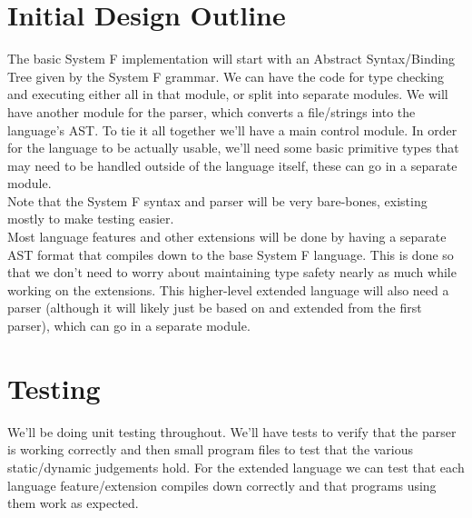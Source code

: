 \documentclass[a4paper,12pt]{article}
\begin{document}
\section{Initial Design Outline}

The basic System F implementation will start with an Abstract Syntax/Binding Tree given by the System F grammar. We can have the code for type checking and executing either all in that module, or split into separate modules. We will have another module for the parser, which converts a file/strings into the language's AST. To tie it all together we'll have a main control module. In order for the language to be actually usable, we'll need some basic primitive types that may need to be handled outside of the language itself, these can go in a separate module.\\

Note that the System F syntax and parser will be very bare-bones, existing mostly to make testing easier.\\

Most language features and other extensions will be done by having a separate AST format that compiles down to the base System F language. This is done so that we don't need to worry about maintaining type safety nearly as much while working on the extensions. This higher-level extended language will also need a parser (although it will likely just be based on and extended from the first parser), which can go in a separate module.

\section{Testing}

We'll be doing unit testing throughout. We'll have tests to verify that the parser is working correctly and then small program files to test that the various static/dynamic judgements hold. For the extended language we can test that each language feature/extension compiles down correctly and that programs using them work as expected.
\end{document}
